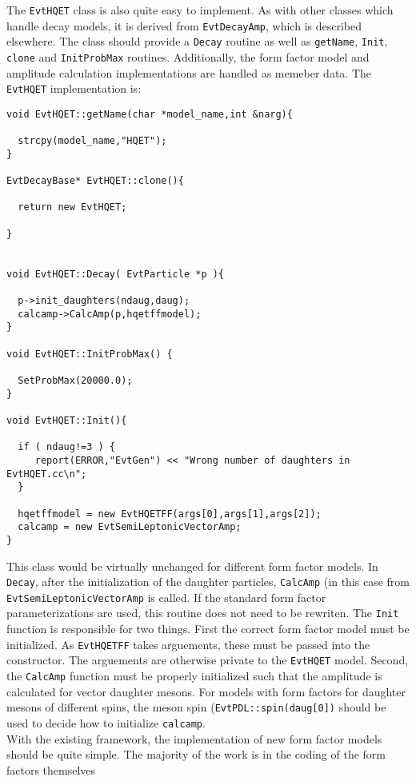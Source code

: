 \noindent The {\tt EvtHQET} class is also quite easy to
implement.  As with other classes which handle decay
models, it is derived from {\tt EvtDecayAmp}, which
is described elsewhere.  The class
should provide a {\tt Decay} routine as well as 
{\tt getName}, {\tt Init}, {\tt clone} 
and {\tt InitProbMax} routines.  Additionally,
the form factor model and amplitude calculation 
implementations are handled as memeber data.  The
{\tt EvtHQET} implementation is:
\begin{verbatim}
void EvtHQET::getName(char *model_name,int &narg){

  strcpy(model_name,"HQET");
}

EvtDecayBase* EvtHQET::clone(){

  return new EvtHQET;

}


void EvtHQET::Decay( EvtParticle *p ){

  p->init_daughters(ndaug,daug);
  calcamp->CalcAmp(p,hqetffmodel);
}

void EvtHQET::InitProbMax() {

  SetProbMax(20000.0);
}

void EvtHQET::Init(){

  if ( ndaug!=3 ) {
     report(ERROR,"EvtGen") << "Wrong number of daughters in EvtHQET.cc\n";
  }

  hqetffmodel = new EvtHQETFF(args[0],args[1],args[2]);
  calcamp = new EvtSemiLeptonicVectorAmp;
}
\end{verbatim}
This class would be virtually unchanged for different
form factor models.  In {\tt Decay}, after the initialization
of the daughter particles, {\tt CalcAmp} (in this case
from {\tt EvtSemiLeptonicVectorAmp} is called.  If the
standard form factor parameterizations are used, this
routine does not need to be rewriten.  The {\tt Init}
function is responsible for two things.  First the correct
form factor model must be initialized.  As {\tt EvtHQETFF}
takes arguements, these must be passed into
the constructor.  The arguements are otherwise private to the
{\tt EvtHQET} model.  Second, the {\tt CalcAmp} function
must be properly initialized such that the amplitude
is calculated for vector daughter mesons.  For models with form
factors for daughter mesons of different spins, the meson
spin ({\tt EvtPDL::spin(daug[0])} should be used to decide 
how to initialize {\tt calcamp}. \\

\noindent With the existing framework, the implementation of
new form factor models should be quite simple.  The majority of
the work is in the coding of the form factors themselves

